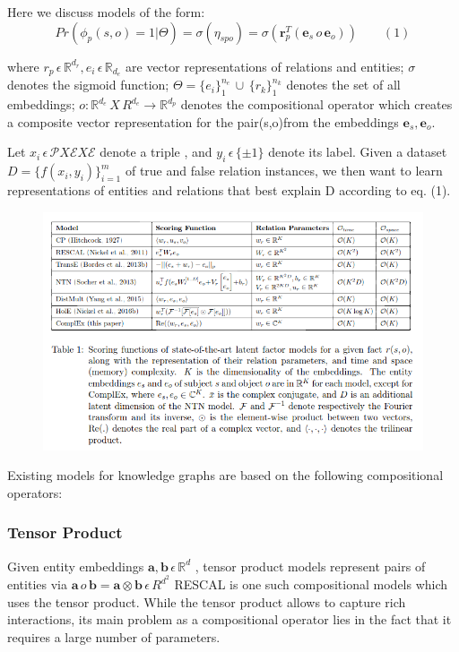 \documentclass[12pt]{article}
\newcommand{\ET}{\mathcal{E}}
\newcommand{\R}{\mathbb{R}}
\begin{document}
Here we discuss models of the form:
$$ Pr(\phi_p(s,o) =1|\Theta) = \sigma(\eta_{spo})  = \sigma(\textbf{r}^T_p(\textbf{e}_s\, o \, \textbf{e}_o)) \qquad (1) $$

where $r_p\, \epsilon \, \R^{d_r} , e_i \, \epsilon \, \R_{d_e}$ are vector representations of relations and entities; $\sigma$ denotes the sigmoid function; $ \Theta = \{e_i\}^{n_e}_1 \,\cup\, \{r_k\}^{n_k}_1$ denotes the set of all embeddings;
$ o : \R^{d_e} \, X \, R^{d_e} \rightarrow \R^{d_p}$ denotes the compositional operator which creates a composite vector representation for the pair(s,o)from the embeddings $\textbf{e}_s, \textbf{e}_o$. 

Let $x_i \,\epsilon\,  \mathcal{P} X \ET X \ET$ denote a triple , and $y_i \, \epsilon\, \{ \pm 1 \}$ denote its label. Given a dataset $D =\{f(x_i, y_i)\}^m_{i=1}$ of true and false relation instances, we then want to learn representations of entities and relations that best explain D according to eq. (1).

\begin{figure}
\includegraphics[width=\textwidth,keepaspectratio]{models.png}
\end{figure}

Existing models for knowledge graphs are based on the following compositional operators:

\subsubsection*{Tensor Product} 
Given entity embeddings $\textbf{a}, \textbf{b} \, \epsilon\, \R^d$ , tensor product models represent pairs of entities via $\textbf{a} \,o\,\textbf{b} = \textbf{a} \otimes  \textbf{b} \,\epsilon\,R^{d^2}$ \newline
RESCAL\cite{Nickel_athree-way} is one such compositional models which uses the tensor product. While the tensor product allows to capture rich interactions, its main problem as a compositional operator lies in the fact that it requires a large number of parameters.
\end{document}
